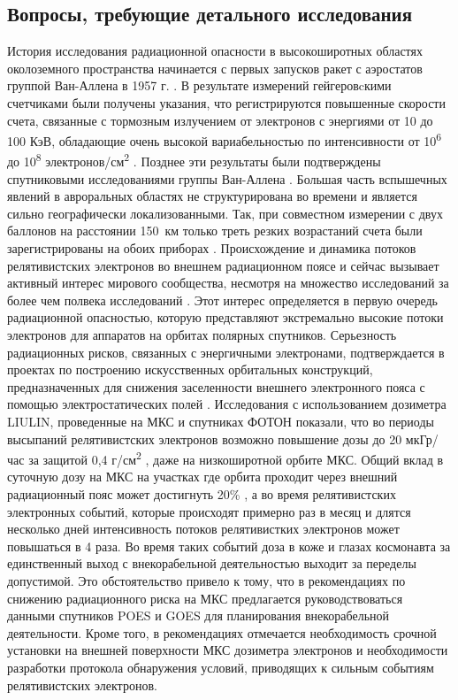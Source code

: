 \subsection{Вопросы, требующие детального исследования}
История исследования радиационной опасности в высокоширотных областях околоземного пространства начинается с первых запусков ракет с аэростатов группой Ван-Аллена в 1957 г. \cite{Brown1966}. В результате измерений гейгеровcкими счетчиками были получены указания, что регистрируются повышенные скорости счета, связанные с тормозным излучением от электронов с энергиями от 10 до 100 КэВ, обладающие очень высокой вариабельностью по интенсивности от 10\textsuperscript{6} до 10\textsuperscript{8} электронов/см\textsuperscript{2} \cite{Brown1966}. Позднее эти результаты были подтверждены спутниковыми исследованиями группы Ван-Аллена \cite{Brown1966}. Большая часть вспышечных явлений в авроральных областях не структурирована во времени и является сильно географически локализованными. Так, при совместном измерении с двух баллонов на расстоянии 150~км только треть резких возрастаний счета были зарегистрированы на обоих приборах \cite{Brown1966}.
Происхождение и динамика потоков релятивистских электронов во внешнем радиационном поясе и сейчас вызывает активный интерес мирового сообщества, несмотря на множество исследований  за более чем полвека исследований \cite{Gussenhoven1997,Borovsky2010,Holeman1991,Miyoshi2011,Chen2016,Turner2013,Brautigam2001,Borovsky2010a,Gussenhoven1995,Borovsky2011,Baker2013,Mullen1998,Chen2014,Morley2010,Potapov2014,Denton2010}. Этот интерес определяется в первую очередь радиационной опасностью, которую представляют экстремально высокие потоки электронов для аппаратов на орбитах полярных спутников. Серьезность радиационных рисков, связанных с энергичными электронами, подтверждается в проектах по построению искусственных орбитальных конструкций, предназначенных для снижения заселенности внешнего электронного пояса с помощью электростатических полей \cite{Hoyt2007}. Исследования с использованием дозиметра LIULIN, проведенные на МКС и спутниках ФОТОН показали, что во периоды высыпаний релятивистских электронов возможно повышение дозы до 20 мкГр/час за защитой 0,4 г/см\textsuperscript{2} \cite{Dachev2009}, даже на низкоширотной орбите МКС. Общий вклад в суточную дозу на МКС  на участках где орбита проходит через внешний радиационный пояс может достигнуть 20\% \cite{council2000radiation}, а во время релятивистских электронных событий, которые происходят примерно раз в месяц и длятся несколько дней интенсивность потоков релятивистких электронов может повышаться в 4 раза.   Во время таких событий доза в коже и глазах космонавта за единственный выход с внекорабельной деятельностью выходит за переделы допустимой. Это обстоятельство привело к тому, что в рекомендациях по снижению радиационного риска  на МКС \cite{council2000radiation} предлагается руководствоваться данными спутников POES и GOES для планирования внекорабельной деятельности. Кроме того, в рекомендациях отмечается необходимость срочной установки на внешней поверхности МКС дозиметра электронов и необходимости разработки протокола обнаружения условий, приводящих к сильным  событиям релятивистских электронов.

